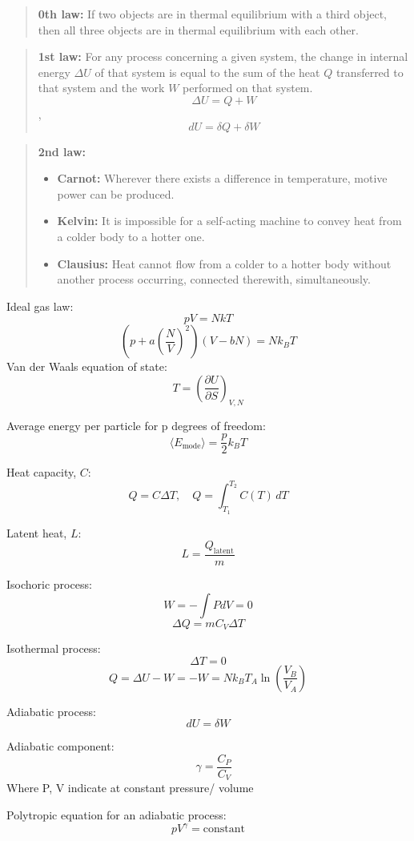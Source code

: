 \documentclass[12pt,a4paper]{article}
\begin{document}
\begin{quote}
\textbf{0th law:} 
If two objects are in thermal equilibrium with a third object, then all three objects are in thermal equilibrium with each other.
\end{quote}
\begin{quote}
\textbf{1st law:} 
For any process concerning a given system, the change in internal energy \(\Delta U\) of that system is equal to the sum of the heat \( Q \) transferred to that system and the work \( W \) performed on that system.
\[ \Delta U = Q + W \] , \[ dU = \delta Q + \delta W\]
\end{quote}

\begin{quote}
\textbf{2nd law:} 
\begin{itemize}
	\item \textbf{Carnot:} Wherever there exists a difference in temperature, motive power can be produced.
	\item \textbf{Kelvin:} It is impossible for a self-acting machine to convey heat from a colder body to a hotter one.
	\item \textbf{Clausius:} Heat cannot flow from a colder to a hotter body without another process occurring, connected therewith, simultaneously.
\end{itemize}
\end{quote}

Ideal gas law: \[ pV = NkT\]
\[ (p + a(\dfrac{N}{V})^2) (V-bN)  = Nk_BT\]
Van der Waals equation of state:\\
\[
T = \left( \frac{\partial U}{\partial S} \right)_{V, N}
\]

Average energy per particle for p degrees of freedom: \[ \langle E_\text{mode} \rangle = \frac{p}{2} k_B T \]


Heat capacity, $C$: \[ Q = C \Delta T, \quad Q = \int_{T_1}^{T_2} C(T) \, dT \]

Latent heat, $L$: \[ L  = \frac{Q_\text{latent}}{m} \]


Isochoric process: \[ W = - \int P dV = 0\]
\[ \Delta Q = m C_V \Delta T\]

Isothermal process: \[ \Delta T = 0\]
\[ Q = \Delta U - W = - W = N k_B T_A \ln (\frac{V_B}{V_A})\]

Adiabatic process: \[ dU = \delta W\]

Adiabatic component: \[ \quad \gamma = \frac{C_P}{C_V} \]
Where P, V indicate at constant pressure/ volume

Polytropic equation for an adiabatic process: \[ pV^\gamma = \text{constant} \]
\end{document}
